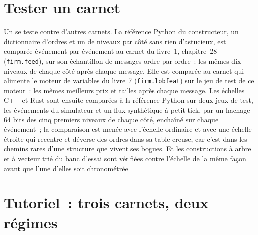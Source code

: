 \section{Tester un carnet}

Un  se teste contre d'autres carnets. La référence Python du constructeur, un dictionnaire d'ordres et un de niveaux par côté
sans rien d'astucieux, est comparée événement par événement au carnet du livre~1, chapitre~28 (\texttt{firm.feed}),
sur son échantillon de messages ordre par ordre~: les mêmes dix niveaux de chaque côté après chaque message. Elle est comparée au carnet
qui alimente le moteur de variables du livre~7 (\texttt{firm.lobfeat}) sur le jeu de test de ce moteur~: les mêmes meilleurs prix et tailles après
chaque message. Les échelles C++ et Rust sont ensuite comparées à la référence Python sur deux jeux de test, les événements du simulateur
et un flux synthétique à petit tick, par un hachage 64 bits des cinq premiers niveaux de chaque côté, enchaîné sur chaque événement~; la
comparaison est menée avec l'échelle ordinaire et avec une échelle étroite qui recentre et déverse des ordres dans sa table creuse, car
c'est dans les chemins rares d'une structure que vivent ses bogues. Et les constructions à arbre et à vecteur trié du banc d'essai sont vérifiées
contre l'échelle de la même façon avant que l'une d'elles soit chronométrée.

\section{Tutoriel~: trois carnets, deux régimes}\label{tut:ll:the-order-book-builder:tut}

